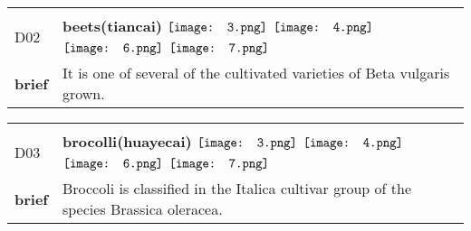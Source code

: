 \documentclass[UTF8]{article}
\begin{document}
            \begin{tabularx}{\textwidth}{p{1.5cm}X}
            \arrayrulecolor{myBlue}
        	\hline\\
            \small{D02}&
            \large{\bfseries{beets(tiancai)}}\hfill
                                                            \phantom{$\vcenter{\hbox{\texttt{[image: 1.png]}}}$}
                                                                \phantom{$\vcenter{\hbox{\texttt{[image: 2.png]}}}$}
                                                                $\vcenter{\hbox{\texttt{[image: 3.png]}}}$
                                                                $\vcenter{\hbox{\texttt{[image: 4.png]}}}$
                                                                \phantom{$\vcenter{\hbox{\texttt{[image: 5.png]}}}$}
                                                                $\vcenter{\hbox{\texttt{[image: 6.png]}}}$
                                                                $\vcenter{\hbox{\texttt{[image: 7.png]}}}$
                                        \\[10pt]
            \large{\bfseries{brief}}&\noindent\parbox[c]{\hsize}{It is one of several of the cultivated varieties of Beta vulgaris grown. } \\[5pt]
            \hline\\[-10pt]
        \end{tabularx}
            \begin{tabularx}{\textwidth}{p{1.5cm}X}
            \arrayrulecolor{myBlue}
        	\hline\\
            \small{D03}&
            \large{\bfseries{brocolli(huayecai)}}\hfill
                                                            \phantom{$\vcenter{\hbox{\texttt{[image: 1.png]}}}$}
                                                                \phantom{$\vcenter{\hbox{\texttt{[image: 2.png]}}}$}
                                                                $\vcenter{\hbox{\texttt{[image: 3.png]}}}$
                                                                $\vcenter{\hbox{\texttt{[image: 4.png]}}}$
                                                                \phantom{$\vcenter{\hbox{\texttt{[image: 5.png]}}}$}
                                                                $\vcenter{\hbox{\texttt{[image: 6.png]}}}$
                                                                $\vcenter{\hbox{\texttt{[image: 7.png]}}}$
                                        \\[10pt]
            \large{\bfseries{brief}}&\noindent\parbox[c]{\hsize}{Broccoli is classified in the Italica cultivar group of the species Brassica oleracea.} \\[5pt]
            \hline\\[-10pt]
        \end{tabularx}
\end{document}
